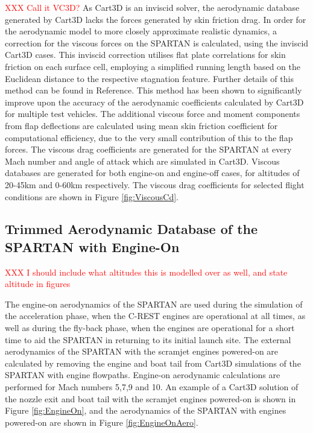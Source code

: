 		\textcolor{red}{XXX Call it VC3D?}
		As Cart3D is an inviscid solver, the aerodynamic database generated by Cart3D lacks the forces generated by skin friction drag. In order for the aerodynamic model to more closely approximate realistic dynamics, a correction for the viscous forces on the SPARTAN is calculated, using the inviscid Cart3D cases. This inviscid correction utilises flat plate correlations for skin friction on each surface cell, employing a simplified running length based on the Euclidean distance to the respective stagnation feature. Further details of this method can be found in Reference\cite{Ward2018}. This method has been shown to significantly improve upon the accuracy of the aerodynamic coefficients calculated by Cart3D for multiple test vehicles\cite{Ward2018}. The additional viscous force and moment components from flap deflections are calculated using mean skin friction coefficient for computational efficiency, due to the very small contribution of this to the flap forces. The viscous drag coefficients are generated for the SPARTAN at every Mach number and angle of attack which are simulated in Cart3D. Viscous databases are generated for both engine-on and engine-off cases, for altitudes of 20-45km and 0-60km respectively.  The viscous drag coefficients for selected flight conditions are shown in Figure \ref{fig:ViscousCd}.
		
		
		
		
		
		\subsection{Trimmed Aerodynamic Database of the SPARTAN with Engine-On}\label{sec:trimmedongineon}
		\textcolor{red}{XXX I should include what altitudes this is modelled over as well, and state altitude in figures}
		
		The engine-on aerodynamics of the SPARTAN are used during the simulation of the acceleration phase, when the C-REST engines are operational at all times, as well as during the fly-back phase, when the engines are operational for a short time to aid the SPARTAN in returning to its initial launch site.
		The external aerodynamics of the SPARTAN with the scramjet engines powered-on are calculated by removing the engine and boat tail from Cart3D simulations of the SPARTAN with engine flowpaths. Engine-on aerodynamic calculations are performed for Mach numbers 5,7,9 and 10. An example of a Cart3D solution of the nozzle exit and boat tail with the scramjet engines powered-on is shown in Figure \ref{fig:EngineOn}, and the aerodynamics of the SPARTAN with engines powered-on are shown in Figure \ref{fig:EngineOnAero}.
		
